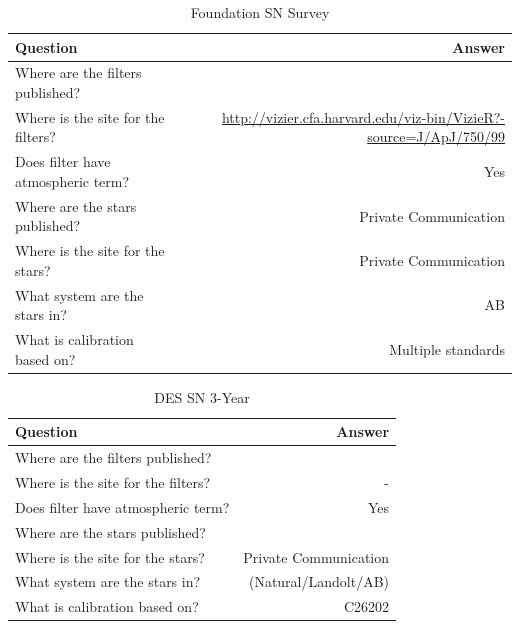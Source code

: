 \documentclass[twocolumn]{aastex63}
\begin{document}
\begin{table}
\label{table:information}
\caption{\large Foundation SN Survey}
\begin{tabular}{lr}
\toprule
    Question & Answer \\
\hline

Where are the filters published? & \cite{Foundation} \\
Where is the site for the filters? & \href{http://vizier.cfa.harvard.edu/viz-bin/VizieR?-source=J/ApJ/750/99}{http://vizier.cfa.harvard.edu/viz-bin/VizieR?-source=J/ApJ/750/99} \\
Does filter have atmospheric term?	& Yes \\
Where are the stars published? & Private Communication \\
Where is the site for the stars? & Private Communication \\
What system are the stars in? & AB \\
What is calibration based on? & Multiple standards \\
\end{tabular}
\end{table}


\begin{table}
\label{table:information}
\caption{\large DES SN 3-Year}
\begin{tabular}{lr}
\toprule
    Question & Answer \\
\hline

Where are the filters published? & \cite{DES} \\
Where is the site for the filters? & - \\
Does filter have atmospheric term?	& Yes \\
Where are the stars published? & \cite{fgcm} \\
Where is the site for the stars? & Private Communication \\
What system are the stars in? & (Natural/Landolt/AB) \\
What is calibration based on? & C26202 \\
\end{tabular}
\end{table}
\end{document}
